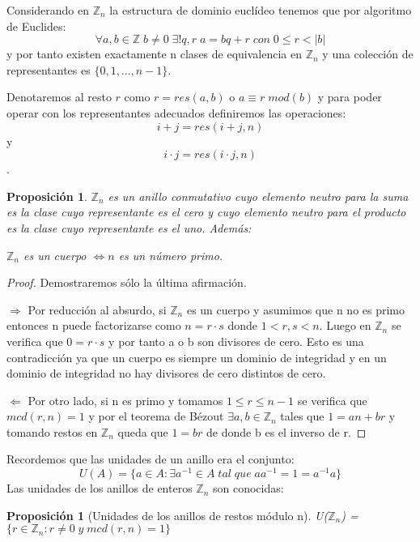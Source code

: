 \documentclass{article}
\theoremstyle{theorem-style}  %
\newtheorem{proposition}[theorem]{Proposición}
\theoremstyle{definition-style}
\theoremstyle{example-style}
\begin{document}
Considerando en $\mathbb{Z}_n$ la estructura de dominio euclídeo tenemos que por algoritmo de Euclides: $$\forall a,b \in \mathbb{Z} \; b \neq 0 \; \exists! q,r \; a = bq+r \; con \; 0 \leq r < |b| $$ y por tanto existen exactamente n clases de equivalencia en $\mathbb{Z}_n$ y una colección de representantes es $\{0,1,...,n-1\}$.

Denotaremos al resto $r$ como $r = res(a,b)$ o $a \equiv r \; mod(b)$ y para poder operar con los representantes adecuados definiremos las operaciones: $$i+j = res(i+j,n)$$ y $$i \cdot j = res(i \cdot j,n)$$.

\begin{proposition}
$\mathbb{Z}_n$ es un anillo conmutativo cuyo elemento neutro para la suma es la clase cuyo representante es el cero y cuyo elemento neutro para el producto es la clase cuyo representante es el uno. Además:

$\mathbb{Z}_n$ es un cuerpo $\iff n$ es un número primo.
\end{proposition}

\begin{proof}

Demostraremos sólo la última afirmación. 

$\Rightarrow$ Por reducción al absurdo, si $\mathbb{Z}_n$ es un cuerpo y asumimos que n no es primo entonces n puede factorizarse como $n = r \cdot s$ donde $1 < r,s < n$. Luego en $\mathbb{Z}_n$ se verifica que $0 = r \cdot s$ y por tanto a o b son divisores de cero. Esto es una contradicción ya que un cuerpo es siempre un dominio de integridad y en un dominio de integridad no hay divisores de cero distintos de cero.

$\Leftarrow$ Por otro lado, si n es primo y tomamos $1 \leq r \leq n-1$ se verifica que $mcd(r,n) = 1$ y por el teorema de Bézout $\exists a,b \in \mathbb{Z}_n$ tales que $1 = an + br$ y tomando restos en $\mathbb{Z}_n$ queda que $1 = br$ de donde b es el inverso de r.

\end{proof}

Recordemos que las unidades de un anillo era el conjunto: $$U(A) = \{a \in A : \exists a^{-1} \in A \; tal \; que \; aa^{-1}=1=a^{-1}a\}$$ Las unidades de los anillos de enteros $\mathbb{Z}_n$ son conocidas:

\begin{proposition}[Unidades de los anillos de restos módulo n]
U($\mathbb{Z}_n$) = $\{r \in \mathbb{Z}_n : r \neq 0 \; y \; mcd(r,n) = 1 \}$
\end{proposition}
\end{document}
